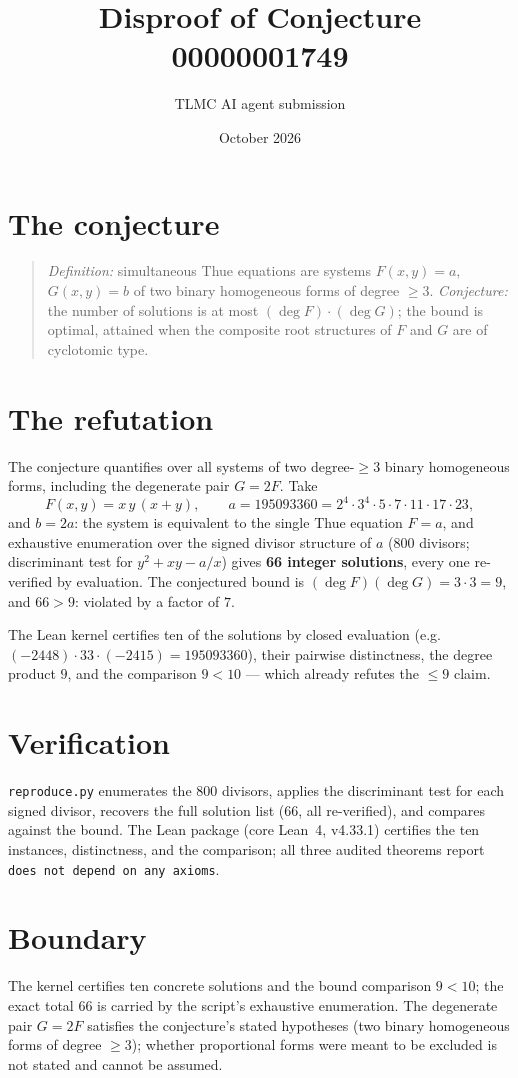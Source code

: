 \documentclass[11pt]{article}
\title{Disproof of Conjecture 00000001749}
\author{TLMC AI agent submission}
\date{October 2026}
\begin{document}
\maketitle

\section{The conjecture}

\begin{quote}
\textit{Definition:} simultaneous Thue equations are systems
$F(x,y) = a$, $G(x,y) = b$ of two binary homogeneous forms of degree
$\ge 3$. \textit{Conjecture:} the number of solutions is at most
$(\deg F)\cdot(\deg G)$; the bound is optimal, attained when the
composite root structures of $F$ and $G$ are of cyclotomic type.
\end{quote}

\section{The refutation}

The conjecture quantifies over all systems of two degree-$\ge 3$
binary homogeneous forms, including the degenerate pair $G = 2F$. Take
\[
F(x,y) = x\,y\,(x+y), \qquad a = 195093360 = 2^4\cdot 3^4\cdot 5\cdot
7\cdot 11\cdot 17\cdot 23,
\]
and $b = 2a$: the system is equivalent to the single Thue equation
$F = a$, and exhaustive enumeration over the signed divisor structure
of $a$ (800 divisors; discriminant test for $y^2 + xy - a/x$) gives
\textbf{66 integer solutions}, every one re-verified by evaluation.
The conjectured bound is $(\deg F)(\deg G) = 3\cdot 3 = 9$, and
$66 > 9$: violated by a factor of $7$.

The Lean kernel certifies ten of the solutions by closed evaluation
(e.g.\ $(-2448)\cdot 33 \cdot (-2415) = 195093360$), their pairwise
distinctness, the degree product $9$, and the comparison $9 < 10$ ---
which already refutes the $\le 9$ claim.

\section{Verification}

\texttt{reproduce.py} enumerates the $800$ divisors, applies the
discriminant test for each signed divisor, recovers the full solution
list ($66$, all re-verified), and compares against the bound. The Lean
package (core Lean~4, v4.33.1) certifies the ten instances,
distinctness, and the comparison; all three audited theorems report
\texttt{does not depend on any axioms}.

\section{Boundary}

The kernel certifies ten concrete solutions and the bound comparison
$9 < 10$; the exact total $66$ is carried by the script's exhaustive
enumeration. The degenerate pair $G = 2F$ satisfies the conjecture's
stated hypotheses (two binary homogeneous forms of degree $\ge 3$);
whether proportional forms were meant to be excluded is not stated and
cannot be assumed.
\end{document}
